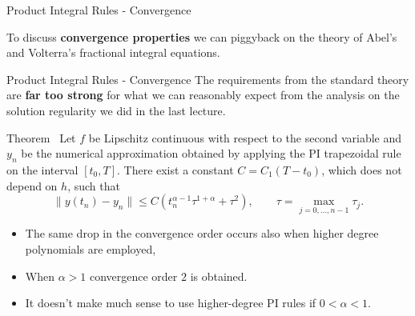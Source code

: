 \documentclass[aspectratio=169,xcolor=dvipsnames]{beamer}
\begin{document}
\begin{frame}{Product Integral Rules - Convergence}

To discuss \textbf{convergence properties} we can piggyback on the theory of Abel's and Volterra's fractional integral equations.

\end{frame}

\begin{frame}{Product Integral Rules - Convergence}
The requirements from the standard theory are \textbf{far too strong} for what we can reasonably expect from the analysis on the solution regularity we did in the last lecture.

\begin{alertblock}{Theorem~\parencite{JenniferDixon}}
Let $f$ be Lipschitz continuous with respect to the second variable and $y_n$ be the numerical approximation obtained by applying the PI trapezoidal rule on the interval $[t_0,T]$. There exist a constant $C = C_1(T-t_0)$, which does not depend on $h$, such that
\[
\| y(t_n) - y_n \| \leq C (t_n^{\alpha-1} \tau^{1+\alpha} + \tau^2), \qquad \tau = \max_{j=0,\ldots,n-1} \tau_j.
\]
\end{alertblock}

\begin{itemize}
	\item<2-> The same drop in the convergence order occurs also when higher degree polynomials are employed,
	\item<3-> When $\alpha > 1$ convergence order $2$ is obtained.
	\item[\faBrain]<4-> It doesn't make much sense to use higher-degree PI rules if $0 < \alpha < 1$.
\end{itemize}

\end{frame}
\end{document}
